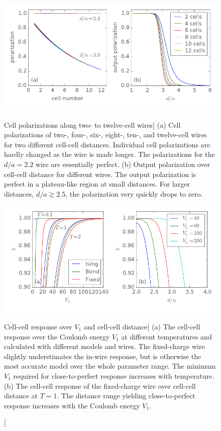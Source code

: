 \begin{figure}
  \center
  \includegraphics{wire_polarization}
  \vspace*{-0.5cm}
  \caption
  [Cell polarizations along two- to twelve-cell wires]
  {
  (a) Cell polarizations of two-, four-, six-, eight-, ten-, and twelve-cell
  wires for two different cell-cell distances. Individual cell polarizations are
  hardly changed as the wire is made longer. The polarizations for the $d/a =
  2.2$ wire are essentially perfect.
  (b) Output polarization over cell-cell distance for different wires. The
  output polarization is perfect in a plateau-like region at small distances.
  For larger distances, $d/a \gtrsim 2.5$, the polarization very quickly drops
  to zero.
  }
  \label{fig:wire_polarization}

  \vspace*{0.75cm}
  
  \includegraphics{chis}
  \vspace*{-0.5cm}
  \caption
  [Cell-cell response over $V_1$ and cell-cell distance]
  {
  (a) The cell-cell response over the Coulomb energy $V_1$ at different
  temperatures and calculated with different models and wires. The fixed-charge
  wire slightly understimates the in-wire response, but is otherwise the most
  accurate model over the whole parameter range. The minimum $V_1$ required for
  close-to-perfect response increases with temperature.
  (b) The cell-cell response of the fixed-charge wire over cell-cell distance at
  $T = 1$. The distance range yielding close-to-perfect response increases with
  the Coulomb energy $V_1$.
  }
  \label{fig:chis}
\end{figure}

